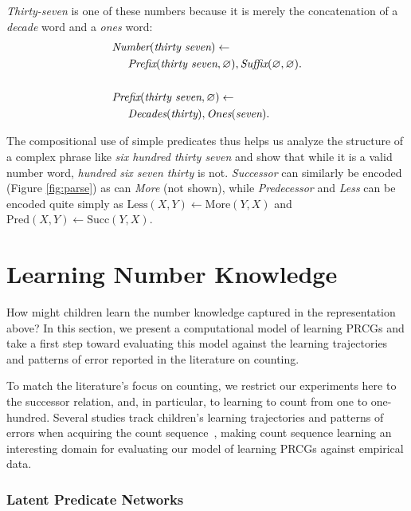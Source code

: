 \documentclass[10pt,letterpaper]{article}
\begin{document}
\noindent\emph{Thirty-seven} is one of these numbers because it is
merely the concatenation of a \emph{decade} word and a \emph{ones}
word:
\begin{align}
  & \textit{Number}(\textit{thirty seven}) \leftarrow\\
  & \hspace{0.5cm} \textit{Prefix}(\textit{thirty seven}, \varnothing), \textit{Suffix}(\varnothing,\varnothing).\notag\\
  \notag\\
  & \textit{Prefix}(\textit{thirty seven}, \varnothing) \leftarrow\\
  & \hspace{0.5cm} \textit{Decades}(\textit{thirty}), \textit{Ones}(\textit{seven}).\notag
\end{align}


\noindent The compositional use of simple predicates thus helps us
analyze the structure of a complex phrase like \emph{six hundred
  thirty seven} and show that while it is a valid number word,
\emph{hundred six seven thirty} is not. \emph{Successor} can similarly
be encoded (Figure \ref{fig:parse}) as can \emph{More} (not shown),
while \emph{Predecessor} and \emph{Less} can be encoded quite simply
as $\text{Less}(X,Y) \leftarrow \text{More}(Y,X)$ and
$\text{Pred}(X,Y) \leftarrow \text{Succ}(Y,X)$.

\section{Learning Number Knowledge}

How might children learn the number knowledge captured in the
representation above? In this section, we present a computational
model of learning PRCGs and take a first step toward evaluating this
model against the learning trajectories and patterns of error reported
in the literature on counting.

To match the literature's focus on counting, we restrict our
experiments here to the successor relation, and, in particular, to
learning to count from one to one-hundred. Several studies track
children's learning trajectories and patterns of errors when acquiring
the count sequence~\citep{FusRicBriar1982,miller1987counting}, making
count sequence learning an interesting domain for evaluating our model
of learning PRCGs against empirical data.

\subsubsection{Latent Predicate Networks}
\end{document}

